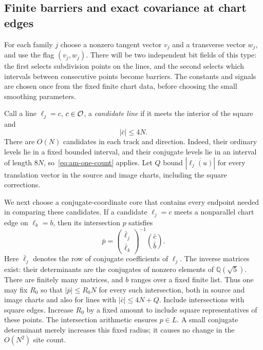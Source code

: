 \subsection{Finite barriers and exact covariance at chart edges}

For each family $j$ choose a nonzero tangent vector $v_j$ and a transverse
vector $w_j$, and use the flag $(v_j,w_j)$.  There will be two independent
bit fields of this type: the first selects subdivision points on the lines,
and the second selects which intervals between consecutive points become
barriers.  The constants and signals are chosen once from the fixed finite
chart data, before choosing the small smoothing parameters.

Call a line $\ell_j=c$, $c\in\mathcal O$, a \emph{candidate line} if it meets the
interior of the square and
\begin{equation}\label{eq:am-candidate}
 |\bar c|\le4N.
\end{equation}
There are $O(N)$ candidates in each track and direction.  Indeed, their
ordinary levels lie in a fixed bounded interval, and their conjugate levels
lie in an interval of length $8N$, so~\eqref{eq:am-one-count} applies.
Let $Q$ bound $|\overline{\ell_j(u)}|$ for every translation vector in the
source and image charts, including the square corrections.

We next choose a conjugate-coordinate core that contains every endpoint
needed in comparing these candidates.  If a candidate $\ell_j=c$ meets a
nonparallel chart edge on $\ell_k=b$, then its intersection $p$ satisfies
\begin{equation}\label{eq:am-core-equations}
 \bar p=
 \begin{pmatrix}\bar\ell_j\\ \bar\ell_k\end{pmatrix}^{-1}
 \binom{\bar c}{\bar b}.
\end{equation}
Here $\bar\ell_j$ denotes the row of conjugate coefficients of $\ell_j$.
The inverse matrices exist: their determinants are the conjugates of
nonzero elements of $\mathbb Q(\sqrt5)$.  There are finitely many matrices,
and $b$ ranges over a fixed finite list.  Thus one may fix $R_0$ so that
$|\bar p|\le R_0N$ for every such intersection, both in source and image
charts and also for lines with $|\bar c|\le4N+Q$.  Include intersections
with square edges.  Increase $R_0$ by a fixed amount to include square
representatives of these points.  The intersection arithmetic ensures
$p\in L$.  A small conjugate determinant merely increases this fixed
radius; it causes no change in the $O(N^2)$ site count.

